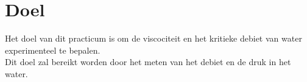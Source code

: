 \section{Doel}

Het doel van dit practicum is om de viscociteit en het
kritieke debiet van water experimenteel te bepalen.
\\
Dit doel zal bereikt worden door het meten van het debiet
en de druk in het water.
